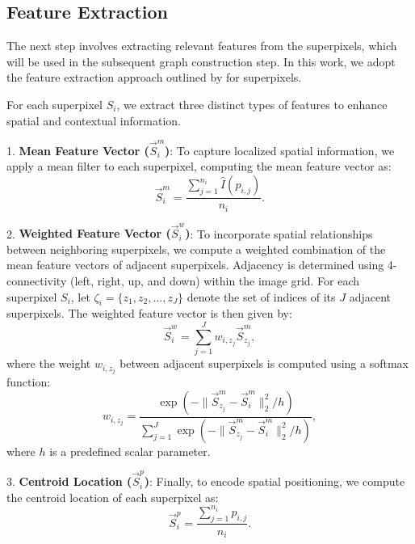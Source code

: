 \subsection{Feature Extraction} \label{sec:feature}

The next step involves extracting relevant features from the superpixels, which will be used in the subsequent graph construction step. In this work, we adopt the feature extraction approach outlined by \citet{sellars2020} for superpixels.

For each superpixel \( S_i \), we extract three distinct types of features to enhance spatial and contextual information.  

1. \textbf{Mean Feature Vector (\(\vec{S}_i^m\))}:  
   To capture localized spatial information, we apply a mean filter to each superpixel, computing the mean feature vector as:  
   \begin{equation} \label{equ:mean_filter}
       \vec{S}_i^m = \frac{\sum_{j=1}^{n_i} \hat{I}(p_{i, j})}{n_i}.
   \end{equation}  

2. \textbf{Weighted Feature Vector (\(\vec{S}_i^w\))}:  
   To incorporate spatial relationships between neighboring superpixels, we compute a weighted combination of the mean feature vectors of adjacent superpixels. Adjacency is determined using 4-connectivity (left, right, up, and down) within the image grid. For each superpixel \( S_i \), let \( \zeta_i = \{z_1, z_2, \dots, z_J\} \) denote the set of indices of its \( J \) adjacent superpixels. The weighted feature vector is then given by:  
   \begin{equation} \label{equ:weighted_filter}
       \vec{S}_i^w = \sum_{j=1}^{J} w_{i, z_j} \vec{S}_{z_j}^m,
   \end{equation}  
   where the weight \( w_{i, z_j} \) between adjacent superpixels is computed using a softmax function:  
   \begin{equation} \label{equ:weight_softmax}
       w_{i, z_j} = \frac{\exp\left(-\|\vec{S}_{z_j}^m - \vec{S}_i^m\|_2^2 / h\right)}{\sum_{j=1}^{J} \exp\left(-\|\vec{S}_{z_j}^m - \vec{S}_i^m\|_2^2 / h\right)},
   \end{equation}  
   where \( h \) is a predefined scalar parameter.  

3. \textbf{Centroid Location (\(\vec{S}_i^p\))}:  
   Finally, to encode spatial positioning, we compute the centroid location of each superpixel as:  
   \begin{equation} \label{equ:centroid}
       \vec{S}_i^p = \frac{\sum_{j=1}^{n_i} p_{i, j}}{n_i}.
   \end{equation}
